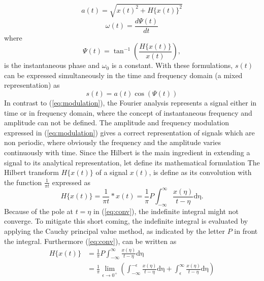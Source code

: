 \documentclass[../Main/thesis.tex]{subfiles}
\begin{document}
\begin{equation}\label{eq:amplitude}
a(t) = \sqrt{x(t)^{2} + H\{x(t) \}^{2} }
\end{equation}
\begin{equation}\label{eq:frequency}
\omega(t) = \frac{d \Psi(t)}{dt} 
\end{equation}
where 
\begin{equation}\label{eq:frequency}
\Psi(t) = \tan^{-1}\left(\frac{H\{x(t) \}}{x(t)} \right),
\end{equation}
is the instantaneous phase and $\omega_{0}$ is a constant. With these formulations, $s(t)$ can be expressed simultaneously in the time and frequency domain (a mixed representation) as 
\begin{equation}\label{eq:modulation}
	s(t) = a(t)\cos\left( \Psi(t)\right) 
\end{equation}
In contrast to (\ref{eq:modulation}), the Fourier analysis represents a signal either in time or in frequency domain, where the concept of instantaneous frequency and amplitude can not be defined. The amplitude and frequency modulation expressed in (\ref{eq:modulation}) gives a correct representation of signals which are non periodic, where obviously the frequency and the amplitude varies continuously with time. Since the Hilbert is the main ingredient in extending a signal to its analytical representation, let define its mathematical formulation
\justify
The Hilbert transform $H\{ x(t) \}$ of a signal $x(t)$, is define as its convolution with the function $\frac{1}{\pi t}$ expressed as
\begin{equation}\label{eq:conv}
H\{ x(t) \} = \frac{1}{\pi t}* x(t) = 	\frac{1}{\pi}P \int_{-\infty}^{\infty}\frac{x(\eta)}{t-\eta}\mathrm{d\eta}.
\end{equation}
Because of the pole at $t=\eta$ in (\ref{eq:conv}), the indefinite integral might not converge. To mitigate this short coming, the indefinite integral is evaluated by applying the Cauchy principal value method, as indicated by the letter $P$ in front the integral. Furthermore (\ref{eq:conv}), can be written as
\begin{equation}
	\begin{split}
	H\{ x(t) \} &=  \frac{1}{\pi}P \int_{-\infty}^{\infty}\frac{x(\eta)}{t-\eta}\mathrm{d\eta}\\
				&= \frac{1}{\pi}\lim_{\epsilon\rightarrow 0^{+}} \left( \int_{-\infty}^{-\epsilon} \frac{x(\eta)}{t-\eta}\mathrm{d\eta} +   \int_{\epsilon}^{\infty} \frac{x(\eta)}{t-\eta}\mathrm{d\eta}     \right)
	\end{split}
\end{equation}
\end{document}
